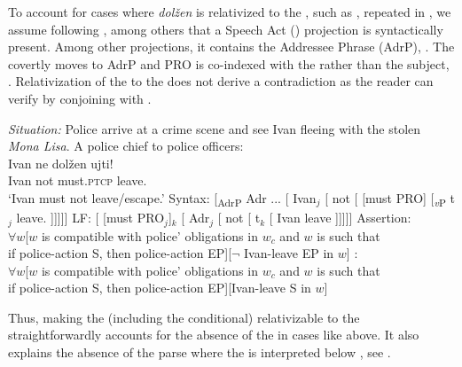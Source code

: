 \documentclass[output=paper,newtxmath,colorlinks,citecolor=brown]{langsci/langscibook}
\begin{document}
\ea {}
    \z \z

\noindent To account for cases where \textit{dolžen} is relativized to the , such as , repeated in , we assume following \citet{speten03}, among others that a Speech Act () projection is syntactically present. Among other projections, it contains the Addressee Phrase (AdrP), . The  covertly moves to AdrP and PRO is co-indexed with the  rather than the subject, . Relativization of the  to the  does not derive a contradiction as the reader can verify by conjoining  with .

\ea \label{obvgen} \ea \label{obv} \textit{Situation:} Police arrive at a crime scene and see Ivan fleeing with the stolen \emph{Mona Lisa}. A police chief to police officers:\\[5pt]
	{\gll  Ivan ne dolžen ujti!\\
	Ivan  not must.\textsc{ptcp} leave.\p \\
	\glt `Ivan must not leave/escape.'}
	\ex Syntax:  [\textsubscript{AdrP} Adr ... [ Ivan$_j$  [ not [ [must PRO]  [\textsubscript{\textit{v}P} t$_j$ {leave.\p} ]]]]] \label{obvsyn}
	\ex LF:  [ [must PRO$_j$]$_k$ [ Adr$_j$ [ not [ t$_k$ [ Ivan leave  ]]]]] \label{obvlf}
         \ex Assertion: \\
    $\forall w$[$w$ is compatible with police' obligations in $w_c$ and $w$ is such that \\
    if police-action S, then police-action EP][$\neg$ Ivan-leave EP in $w$] \label{assertobv}
    \ex {}: \\
    $\forall w$[$w$ is compatible with police' obligations in $w_c$ and $w$ is such that \\
    if police-action S, then police-action EP][Ivan-leave S in $w$] \label{siobv}
    \z \z


\noindent Thus, making the  (including the conditional) relativizable to the  straightforwardly accounts for the absence of the  in cases like above. It also explains the absence of the parse where the  is interpreted below , see .
\end{document}
